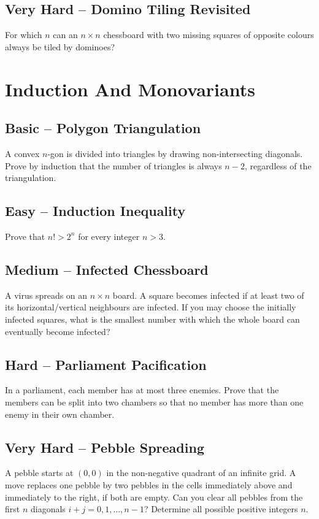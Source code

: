 \documentclass[12pt]{article}
\begin{document}
\subsection*{Very Hard -- Domino Tiling Revisited}
For which $n$ can an $n\times n$ chessboard with two missing squares
of opposite colours always be tiled by dominoes?

\section{Induction And Monovariants}

\subsection*{Basic -- Polygon Triangulation}
A convex $n$-gon is divided into triangles by drawing non-intersecting
diagonals. Prove by induction that the number of triangles is always
$n-2$, regardless of the triangulation.

\subsection*{Easy -- Induction Inequality}
Prove that $n!>2^n$ for every integer $n>3$.

\subsection*{Medium -- Infected Chessboard}
A virus spreads on an $n\times n$ board. A square becomes infected if
at least two of its horizontal/vertical neighbours are infected. If
you may choose the initially infected squares, what is the smallest
number with which the whole board can eventually become infected?

\subsection*{Hard -- Parliament Pacification}
In a parliament, each member has at most three enemies. Prove that
the members can be split into two chambers so that no member has more
than one enemy in their own chamber.

\subsection*{Very Hard -- Pebble Spreading}
A pebble starts at $(0,0)$ in the non-negative quadrant of an infinite
grid. A move replaces one pebble by two pebbles in the cells
immediately above and immediately to the right, if both are empty.
Can you clear all
pebbles from the first $n$ diagonals $i+j=0,1,\ldots,n-1$?
Determine all possible positive integers $n$.
\end{document}
